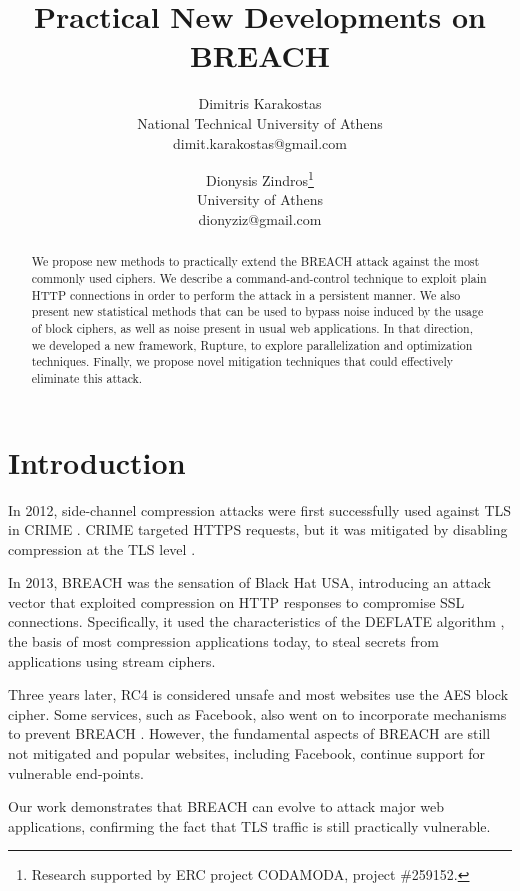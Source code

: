 \documentclass[a4paper, 11 pt, conference]{article}  %
\title{\textbf{Practical New Developments on BREACH}}
\author{
        Dimitris Karakostas\footnotemark[1]\\
        National Technical University of Athens\\
        dimit.karakostas@gmail.com\\
        \and
        Dionysis Zindros\thanks{Research supported by ERC project CODAMODA, project \#259152.}\\
        University of Athens\\
        dionyziz@gmail.com\\
}
\date{}
\begin{document}
\maketitle
\thispagestyle{plain}
\pagestyle{plain}


\begin{abstract}

We propose new methods to practically extend the BREACH attack against the most
commonly used ciphers. We describe a command-and-control technique to
exploit plain HTTP connections in order to perform the attack in a persistent manner.
We also present new statistical methods that can be used to bypass noise induced by
the usage of block ciphers, as well as noise present in usual web applications. In that
direction, we developed a new framework, Rupture, to explore parallelization and
optimization techniques. Finally, we propose novel mitigation techniques that could
effectively eliminate this attack.

\end{abstract}

\section{Introduction}

In 2012, side-channel compression attacks were first successfully used against
TLS in CRIME \cite{c1}. CRIME targeted HTTPS requests, but it was mitigated by
disabling compression at the TLS level \cite{c2}.

In 2013, BREACH \cite{c3} was the sensation of Black Hat USA, introducing an attack vector that
exploited compression on HTTP responses to compromise SSL connections. Specifically, it
used the characteristics of the DEFLATE algorithm \cite{c4}, the basis of most compression
applications today, to steal secrets from applications using stream ciphers.

Three years later, RC4 is considered unsafe \cite{c5} and most websites use the AES block cipher. Some
services, such as Facebook, also went on to incorporate mechanisms to prevent
BREACH \cite{c6}.
However, the fundamental aspects of BREACH are still not mitigated and popular websites,
including Facebook, continue support for vulnerable end-points.

Our work demonstrates that BREACH can evolve to attack major web applications, confirming
the fact that TLS traffic is still practically vulnerable.
\end{document}

